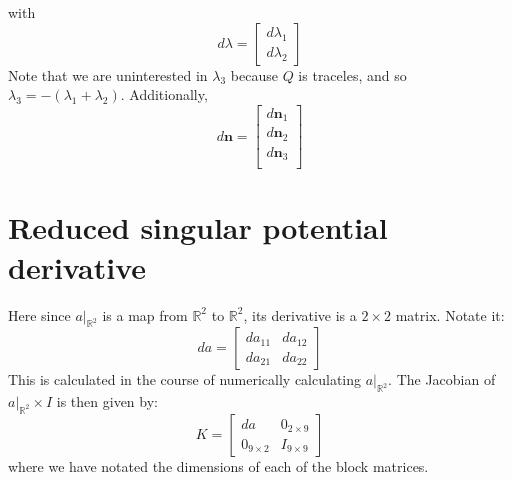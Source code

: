 \documentclass[reqno]{article}
\begin{document}
with
\begin{equation}
    d \lambda
    =
    \begin{bmatrix}
        d \lambda_1 \\
        d \lambda_2
    \end{bmatrix}
\end{equation}
Note that we are uninterested in $\lambda_3$ because $Q$ is traceles, and so $\lambda_3 = -(\lambda_1 + \lambda_2)$.
Additionally,
\begin{equation}
    d \mathbf{n}
    =
    \begin{bmatrix}
        d \mathbf{n}_1 \\
        d \mathbf{n}_2 \\
        d \mathbf{n}_3 \\
    \end{bmatrix}
\end{equation}

\section{Reduced singular potential derivative}
Here since $a|_{\mathbb{R}^2}$ is a map from $\mathbb{R}^2$ to $\mathbb{R}^2$, its derivative is a $2\times 2$ matrix.
Notate it:
\begin{equation}
    da
    =
    \begin{bmatrix}
        da_{11} &da_{12} \\
        da_{21} &da_{22}
    \end{bmatrix}
\end{equation}
This is calculated in the course of numerically calculating $a|_{\mathbb{R}^2}$.
The Jacobian of $a|_{\mathbb{R}^2} \times I$ is then given by:
\begin{equation}
    K
    =
    \begin{bmatrix}
        da &0_{2\times 9} \\
        0_{9\times 2} &I_{9\times 9}
    \end{bmatrix}
\end{equation}
where we have notated the dimensions of each of the block matrices.
\end{document}
